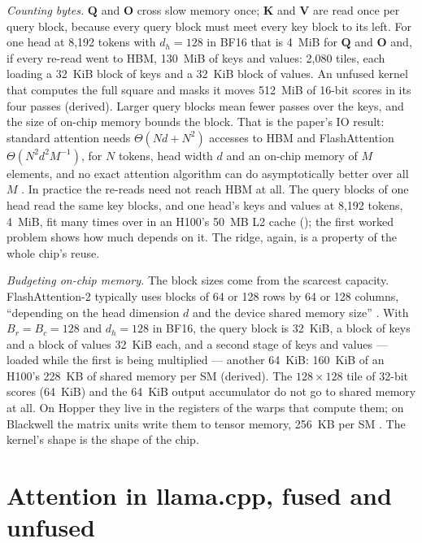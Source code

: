 \emph{Counting bytes.} $\mathbf{Q}$ and $\mathbf{O}$ cross slow memory once;
$\mathbf{K}$ and $\mathbf{V}$ are read once per query block, because every query
block must meet every key block to its left. For one head at 8,192 tokens with
$d_h = 128$ in BF16 that is 4~MiB for $\mathbf{Q}$ and $\mathbf{O}$ and, if
every re-read went to HBM, 130~MiB of keys and values: 2,080 tiles, each
loading a 32~KiB block of keys and a 32~KiB block of values. An unfused kernel
that computes the full square and masks it moves 512~MiB of 16-bit scores in
its four passes (derived). Larger query blocks mean fewer passes over the keys,
and the size of on-chip memory bounds the block. That is the paper's IO result:
standard attention needs $\Theta(Nd + N^2)$ accesses to HBM and FlashAttention
$\Theta(N^2 d^2 M^{-1})$, for $N$ tokens, head width $d$ and an on-chip memory
of $M$ elements, and no exact attention algorithm can do asymptotically better
over all $M$ \cite[Theorem~2 and Proposition~3]{dao2022flashattention}. In
practice the re-reads need not reach HBM at all. The query blocks of one head
read the same key blocks, and one head's keys and values at 8,192 tokens, 4~MiB,
fit many times over in an H100's 50~MB L2 cache (); the
first worked problem shows how much depends on it. The ridge, again, is a
property of the whole chip's reuse.

\emph{Budgeting on-chip memory.} The block sizes come from the scarcest
capacity. FlashAttention-2 typically uses blocks of 64 or 128 rows by 64 or 128
columns, ``depending on the head dimension $d$ and the device shared memory
size'' \cite{dao2023flashattention2}. With $B_r = B_c = 128$ and $d_h = 128$ in
BF16, the query block is 32~KiB, a block of keys and a block of values 32~KiB
each, and a second stage of keys and values --- loaded while the first is being
multiplied --- another 64~KiB: 160~KiB of an H100's 228~KB of shared memory per
SM (derived). The $128 \times 128$ tile of 32-bit scores (64~KiB) and the
64~KiB output accumulator do not go to shared memory at all. On Hopper they
live in the registers of the warps that compute them; on Blackwell the matrix
units write them to tensor memory, 256~KB per SM
\cite{zadouri2026flashattention4}. The kernel's shape is the shape of the chip.

\section{Attention in llama.cpp, fused and unfused}

